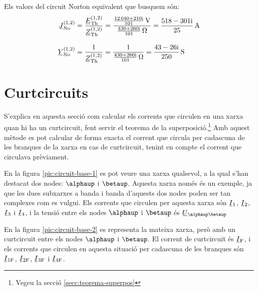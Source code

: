 \begin{exemple}
    Els valors del circuit Norton equivalent que busquem són:
    \begin{align*}
       \cmplx{J}\ped{No}^{(1,2)} &= \frac{\cmplx{E}\ped{Th}^{(1,2)}}{\cmplx{Z}\ped{Th}^{(1,2)}} =
       \frac{\frac{\complexnum{12040+j210}}{101}\,\unit{V}}{\frac{\complexnum{430+j260}}{101}\,\unit{\ohm}} =
       \frac{\complexnum{518-j301}}{25}\,\unit{A} \\[2ex]
       \cmplx{Y}\ped{No}^{(1,2)} &= \frac{1}{\cmplx{Z}\ped{Th}^{(1,2)}} =
       \frac{1}{\frac{\complexnum{430+j260}}{101}\,\unit{\ohm}} = \frac{\complexnum{43-j26}}{250}\,\unit{S}
    \end{align*}

\end{exemple}


\section{Curtcircuits}\label{sec:xarxes-curtcircuits}

S'explica en aquesta secció  com calcular els corrents que circulen en una xarxa quan hi ha un curtcircuit, fent servir el teorema de la superposició.\footnote{Vegeu la secció \ref{secc:teorema-superpos}} Amb aquest mètode es pot calcular de forma exacta el corrent que circula per cadascuna de les branques de la xarxa en cas de curtcircuit, tenint en compte el corrent que circulava prèviament.

En la figura \vref{pic:circuit-base-1} es pot veure una xarxa qualsevol, a la qual s'han destacat dos nodes: $\alphaup$ i $\betaup$. Aquesta xarxa només és un exemple, ja que les dues subxarxes a banda i banda d'aquests dos nodes poden ser tan complexes com es vulgui. Els corrents que circulen per aquesta xarxa són $\cmplx{I}_1$, $\cmplx{I}_2$, $\cmplx{I}_3$ i $\cmplx{I}_4$, i la tensió entre els nodes $\alphaup$ i $\betaup$ és $\cmplx{U}_{\alphaup\betaup}$

\begin{center}
	
	\label{pic:circuit-base-1}
\end{center}

En la figura \vref{pic:circuit-base-2} es representa la mateixa xarxa, però amb un curtcircuit entre  els nodes $\alphaup$ i $\betaup$. El corrent de curtcircuit és $\cmplx{I}\ped{F}$, i els corrents que circulen en aquesta situació per cadascuna de les branques són $\cmplx{I}\ped{1F}$, $\cmplx{I}\ped{2F}$, $\cmplx{I}\ped{3F}$ i $\cmplx{I}\ped{4F}$.

